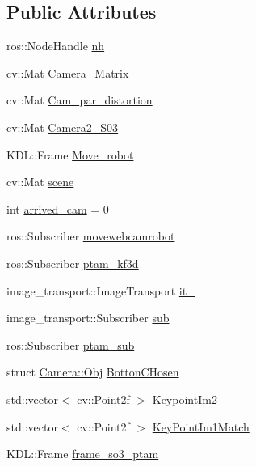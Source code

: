 \subsection*{Public Attributes}
\begin{DoxyCompactItemize}
\item 
ros\-::\-Node\-Handle \hyperlink{classCamera_a8e5072bfde6efd4cb45a7231cca8ed52}{nh}
\item 
cv\-::\-Mat \hyperlink{classCamera_afd3dfe7ee73602d4b47192008d49ec5d}{Camera\-\_\-\-Matrix}
\item 
cv\-::\-Mat \hyperlink{classCamera_ae7a364a692c470227f2bc191b21f901f}{Cam\-\_\-par\-\_\-distortion}
\item 
cv\-::\-Mat \hyperlink{classCamera_ac663c1988261ce865b4504a200276b3c}{Camera2\-\_\-\-S03}
\item 
K\-D\-L\-::\-Frame \hyperlink{classCamera_aabba2a74f24c615abb26ee433fb09b43}{Move\-\_\-robot}
\item 
cv\-::\-Mat \hyperlink{classCamera_a1472be6a92f776d41cc12ebb6529fc74}{scene}
\item 
int \hyperlink{classCamera_adab75acb909d6bfb2caebccb8b79e6e5}{arrived\-\_\-cam} = 0
\item 
ros\-::\-Subscriber \hyperlink{classCamera_a81ec320a1f88feb728a21c6f7f57ebd8}{movewebcamrobot}
\item 
ros\-::\-Subscriber \hyperlink{classCamera_a8c9fec85e18c979baa250cc8582a6f30}{ptam\-\_\-kf3d}
\item 
image\-\_\-transport\-::\-Image\-Transport \hyperlink{classCamera_aa96bda66d1fd41b525da47f086ea5a89}{it\-\_\-}
\item 
image\-\_\-transport\-::\-Subscriber \hyperlink{classCamera_aa4d0866cc975c1f0383e3e46bc7a2f6c}{sub}
\item 
ros\-::\-Subscriber \hyperlink{classCamera_a353766709ed7bdd512b720bdbea0d971}{ptam\-\_\-sub}
\item 
struct \hyperlink{structCamera_1_1Obj}{Camera\-::\-Obj} \hyperlink{classCamera_a55fdd9bd264fca1c865c497fcdb4e74f}{Botton\-C\-Hosen}
\item 
std\-::vector$<$ cv\-::\-Point2f $>$ \hyperlink{classCamera_ab4604f1bddb77d7c8a1000e2f7e460b3}{Keypoint\-Im2}
\item 
std\-::vector$<$ cv\-::\-Point2f $>$ \hyperlink{classCamera_afb480f1314f4746356faf0c37907c20e}{Key\-Point\-Im1\-Match}
\item 
K\-D\-L\-::\-Frame \hyperlink{classCamera_a3d3770ba9ff2a24ee1bc8f51ebc24586}{frame\-\_\-so3\-\_\-ptam}
\item 

\end{DoxyCompactItemize}
